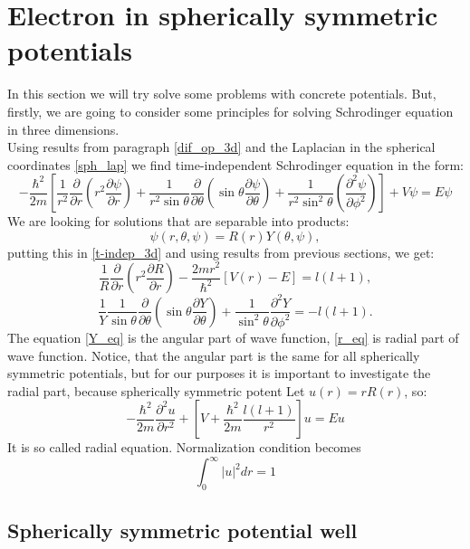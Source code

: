 \documentclass[a4paper, 14pt]{article}
\begin{document}
\section{Electron in spherically symmetric potentials}\label{e_sph_poten}
In this section we will try solve some problems with concrete potentials. But, firstly, we are going to consider some principles for solving  Schrodinger equation in three dimensions.\\
Using results from paragraph \ref{dif_op_3d} and the Laplacian in the spherical coordinates \eqref{sph_lap}  we find time-independent Schrodinger equation in the form:
\begin{equation}\label{t-indep_3d}
-\frac{\hbar^2}{2m}[\frac{1}{r^2} \frac{\partial}{\partial r}({r^2}\frac{\partial \psi}{\partial r})+\frac{1}{r^2\sin{\theta}}\frac{\partial}{\partial \theta}(\sin{\theta}\frac{\partial \psi}{\partial \theta})+\frac{1}{r^2\sin^2{\theta}}(\frac{\partial^2 \psi}{\partial \phi^2}) ] + V\psi = E \psi
\end{equation}
We are looking for solutions that are separable into products:
$$\psi (r, \theta, \psi) = R(r)Y(\theta, \psi),$$
putting this in \eqref{t-indep_3d} and using results from previous sections, we get:
\begin{equation}\label{r_eq}
	\frac{1}{R}\frac{\partial}{\partial r}(r^2 \frac{\partial R}{\partial r}) - \frac{2m r^2}{\hbar^2}[V(r)-E] = l(l+1),
\end{equation}
\begin{equation}\label{Y_eq}
	\frac{1}{Y}\frac{1}{\sin \theta}\frac{\partial}{\partial \theta}(\sin \theta \frac{\partial Y}{\partial \theta}) + \frac{1}{\sin^2 \theta}\frac{\partial^2 Y}{\partial \phi^2}=-l(l+1).
\end{equation}
The equation \eqref{Y_eq} is the angular part of wave function, \eqref{r_eq} is radial part of wave function. Notice, that  the angular part is the same for all spherically symmetric potentials, but for our purposes it is important to investigate the radial part, because spherically symmetric potent%
Let $u(r) = r R(r)$, so:
\begin{equation}\label{r_eq}
	-\frac{\hbar^2}{2m}\frac{\partial^2 u}{\partial r^2}+[V+\frac{\hbar^2}{2m}\frac{l(l+1)}{r^2}]u = Eu
\end{equation}
It is so called radial equation. Normalization condition becomes
$$\int_{0}^{\infty} |u|^2  dr=1$$

\subsection{Spherically symmetric potential well}
\end{document}
